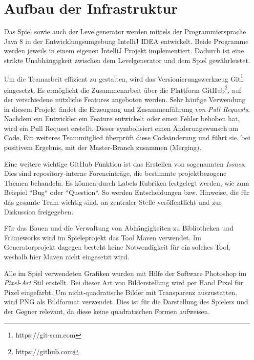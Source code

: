 \section{Aufbau der Infrastruktur}

Das Spiel sowie auch der Levelgenerator werden mittels der Programmiersprache Java 8 in der Entwicklungsumgebung IntelliJ IDEA entwickelt. Beide Programme werden jeweils in einem eigenen IntelliJ Projekt implementiert.
Dadurch ist eine strikte Unabhängigkeit zwischen dem Levelgenerator und dem Spiel gewährleistet.

Um die Teamarbeit effizient zu gestalten, wird das Versionierungswerkzeug Git\footnote{https://git-scm.com} eingesetzt.
Es ermöglicht die Zusammenarbeit über die Plattform GitHub\footnote{https://github.com}, auf der verschiedene nützliche Features angeboten werden.
Sehr häufige Verwendung in diesem Projekt findet die Erzeugung und Zusammenführung \textit{von Pull Requests}.
Nachdem ein Entwickler ein Feature entwickelt oder einen Fehler behoben hat, wird ein Pull Request erstellt.
Dieser symbolisiert einen Änderungswunsch am Code.
Ein weiteres Teammitglied überprüft diese Codeänderung und führt sie, bei positivem Ergebnis, mit der Master-Branch zusammen (Merging).

Eine weitere wichtige GitHub Funktion ist das Erstellen von sogenannten \textit{Issues}.
Dies sind repository-interne Foreneinträge, die bestimmte projektbezogene Themen behandeln.
Es können durch Labels Rubriken festgelegt werden, wie zum Beispiel ``Bug`` oder ``Question``.
So werden Entscheidungen bzw. Hinweise, die für das gesamte Team wichtig sind, an zentraler Stelle veröffentlicht und zur Diskussion freigegeben.

Für das Bauen und die Verwaltung von Abhängigkeiten zu Bibliotheken und Frameworks wird im Spieleprojekt das Tool Maven verwendet.
Im Generatorprojekt dagegen besteht keine Notwendigkeit für ein solches Tool, weshalb hier Maven nicht eingesetzt wird.

Alle im Spiel verwendeten Grafiken wurden mit Hilfe der Software Photoshop im \textit{Pixel-Art} Stil erstellt.
Bei dieser Art von Bilderstellung wird per Hand Pixel für Pixel eingefärbt.
Um nicht-quadratische Bilder mit Transparenz auszustatten, wird PNG als Bildformat verwendet.
Dies ist für die Darstellung des Spielers und der Gegner relevant, da diese keine quadratischen Formen aufweisen.